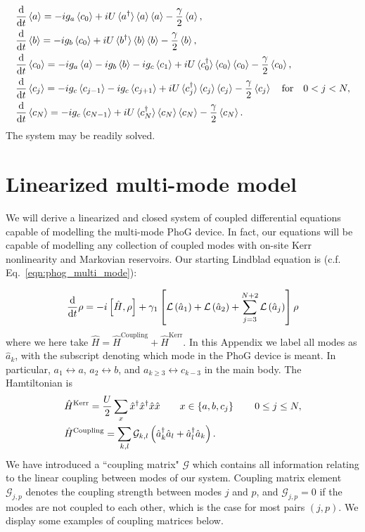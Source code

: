 \begin{align}
&\ddt \ev{a} = - i g_a \ev{c_0} + i U \ev*{a^\dagger} \ev{a} \ev{a} - \frac{\gamma}{2} \ev{a}, \notag \\
%
&\ddt \ev{b} = - i g_b \ev{c_0} + i U \ev*{b^\dagger}\ev{b} \ev{b} - \frac{\gamma}{2} \ev{b}, \notag \\
%
&\ddt \ev{c_0} = - i g_a \ev{a} - i g_b \ev{b} - i g_c \ev{c_1} + i U \ev*{c_0^\dagger} \ev{c_0} \ev{c_0} - \frac{\gamma}{2} \ev{c_0}, \notag \\
%
&\ddt \ev{c_j} = - i g_c \ev{c_{j-1}} - i g_c \ev{c_{j+1}} + i U \ev*{c_j^\dagger} \ev{c_j} \ev{c_j} - \frac{\gamma}{2} \ev{c_j} \qq{for} 0< j < N, \notag \\
%
&\ddt \ev{c_N} = - i g_c \ev{c_{N-1}} + i U \ev*{c_N^\dagger}\ev{c_N} \ev{c_N} - \frac{\gamma}{2} \ev{c_N}.
\end{align}
The system may be readily solved.

\section{Linearized multi-mode model}\label{appendix:multi_mode_linear}
We will derive a linearized and closed system of coupled differential equations capable of modelling the multi-mode PhoG device. In fact, our equations will be capable of modelling any collection of coupled modes with on-site Kerr nonlinearity and Markovian reservoirs. Our starting Lindblad equation is (c.f. Eq.~\ref{eqn:phog_multi_mode}):

\begin{equation}
\frac{\mathrm{d}}{\mathrm{d}t} \rho = - i \left[\hat{H}, \rho\right] + \gamma_1 \left[\mathcal{L}\left(\hat{a}_1\right) + \mathcal{L}\left(\hat{a}_2\right) + \sum_{j=3}^{N+2} \mathcal{L}\left(\hat{a}_j\right) \right] \rho
\end{equation}
where we here take $\hat{H} = \hat{H}^{\text{Coupling}} + \hat{H}^{\text{Kerr}}$. In this Appendix we label all modes as $\hat{a}_k$, with the subscript denoting which mode in the PhoG device is meant. In particular, $a_1 \leftrightarrow a$, $a_2 \leftrightarrow b$, and $a_{k \ge 3} \leftrightarrow c_{k-3}$ in the main body. The Hamtiltonian is
\begin{align}
&\hat{H}^{\text{Kerr}} = \frac{U}{2} \sum_{x} \hat{x}^\dagger \hat{x}^\dagger \hat{x} \hat{x} \qq{} x \in \left\{a, b, c_j\right\} \qq{} 0 \le j \le N, \notag \\
%
&\hat{H}^{\text{Coupling}} = \sum_{k, l} \mathcal{G}_{k, l}\left(\hat{a}_k^\dagger \hat{a}_l + \hat{a}_l^\dagger \hat{a}_k \right).
\end{align}
We have introduced a ``coupling matrix" $\mathcal{G}$ which contains all information relating to the linear coupling between modes of our system. Coupling matrix element $\mathcal{G}_{j, p}$ denotes the coupling strength between modes $j$ and $p$, and $\mathcal{G}_{j, p} = 0$ if the modes are not coupled to each other, which is the case for most pairs $\left(j, p\right)$. We display some examples of coupling matrices below.
